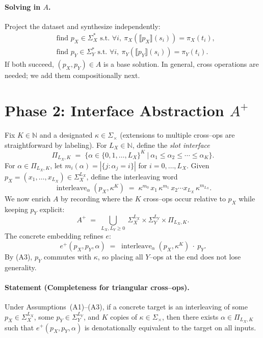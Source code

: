 \documentclass[11pt]{article}
\newcommand{\sem}[1]{\llbracket #1 \rrbracket}
\newcommand{\Nat}{\mathbb{N}}
\newcommand{\abs}[1]{\left\lvert #1 \right\rvert}
\begin{document}
\paragraph{Solving in $A$.} Project the dataset and synthesize independently:
\begin{align*}
&\text{find } p_X\in\Sigma_X^* \text{ s.t. }\forall i,\ \pi_X\!\left(\sem{p_X}(s_i)\right)=\pi_X(t_i),\\
&\text{find } p_Y\in\Sigma_Y^* \text{ s.t. }\forall i,\ \pi_Y\!\left(\sem{p_Y}(s_i)\right)=\pi_Y(t_i).
\end{align*}
If both succeed, $(p_X,p_Y)\in A$ is a base solution. In general, cross operations are needed; we add them compositionally next.

\section{Phase 2: Interface Abstraction \texorpdfstring{$A^{+}$}{A+}}\label{sec:Aplus}
Fix $K\in\Nat$ and a designated $\kappa\in\Sigma_\times$ (extensions to multiple cross--ops are straightforward by labeling). For $L_X\in\Nat$, define the \emph{slot interface}
\[
\Pi_{L_X,K} \;=\; \Big\{ \alpha\in\{0,1,\dots,L_X\}^{K} \ \Big|\ \alpha_1\le \alpha_2\le\cdots\le \alpha_K \Big\}.
\]
For $\alpha\in\Pi_{L_X,K}$, let $m_i(\alpha)=\abs{\{j:\alpha_j=i\}}$ for $i=0,\dots,L_X$. Given $p_X=(x_1,\dots,x_{L_X})\in\Sigma_X^{L_X}$, define the interleaving word
\begin{equation}\label{eq:interleave}
\operatorname{interleave}_\alpha(p_X,\kappa^K)
\;=\;
\kappa^{m_0} \, x_1 \, \kappa^{m_1} \, x_2 \cdots x_{L_X}\, \kappa^{m_{L_X}}.
\end{equation}
We now enrich $A$ by recording where the $K$ cross--ops occur relative to $p_X$ while keeping $p_Y$ explicit:
\begin{equation}\label{eq:Aplus}
A^{+}
\;=\;
\bigcup_{L_X,L_Y\ge 0}\ \Sigma_X^{L_X}\times \Sigma_Y^{L_Y}\times \Pi_{L_X,K}.
\end{equation}
The concrete embedding refines $e$:
\begin{equation}\label{eq:eplus}
e^{+}(p_X,p_Y,\alpha) \;=\; \operatorname{interleave}_\alpha(p_X,\kappa^K)\ \cdot\ p_Y.
\end{equation}
By (A3), $p_Y$ commutes with $\kappa$, so placing all $Y$--ops at the end does not lose generality.

\paragraph{Statement (Completeness for triangular cross--ops).}
Under Assumptions~\textup{(A1)--(A3)}, if a concrete target is an interleaving of some $p_X\in\Sigma_X^{L_X}$, some $p_Y\in\Sigma_Y^{L_Y}$, and $K$ copies of $\kappa\in\Sigma_\times$, then there exists $\alpha\in\Pi_{L_X,K}$ such that $e^{+}(p_X,p_Y,\alpha)$ is denotationally equivalent to the target on all inputs.
\end{document}
